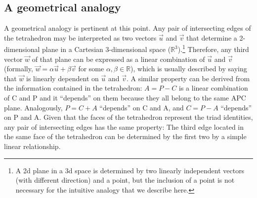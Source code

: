 \documentclass[12pt,oneside,a4paper]{article} %
\newcommand\vt[1]{\textcolor{rd}{#1}}
\begin{document}



\subsection{A geometrical analogy}
A geometrical analogy is pertinent at this point. Any pair of intersecting edges
of the tetrahedron may be interpreted as two vectors $\vec{u}$ and $\vec{v}$
that determine a 2-dimensional plane in a Cartesian 3-dimensional
space ($\mathbb{R}^3$).\footnote{A 2d plane in a 3d space is determined by two linearly independent
vectors (with different direction) and a point, but the inclusion of a point is not
necessary for the intuitive analogy that we describe here.} Therefore, any third
vector $\vec{w}$ of that plane can be expressed as a linear combination of
$\vec{u}$ and $\vec{v}$ (formally, $\vec{w}=\alpha\vec{u}+\beta\vec{v}$ for some $\alpha, \beta \in \mathbb{R}$), which is usually
described by saying that $\vec{w}$ is linearly dependent on $\vec{u}$ and
$\vec{v}$.
A similar property can be derived from the information contained in the
tetrahedron: $A=P-C$ is a linear combination of C and P and it ``depends''
on them because they all belong to the same APC plane. Analogously, $P=C+A$
``depends'' on C and A, and $C=P-A$ ``depends'' on P and A. Given that the faces of the tetrahedron represent the triad identities, any pair of intersecting edges has the same property: The third edge located in the same face of the tetrahedron can be determined by the first two by a simple linear relationship.
\end{document}
